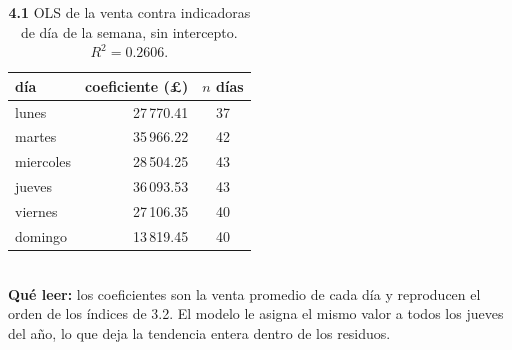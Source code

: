 \begin{table}[htbp]
\centering
\footnotesize
\caption{\textbf{4.1} OLS de la venta contra indicadoras de d\'ia de la semana, sin intercepto. $R^2 = 0.2606$.}
\label{tab:p4_ols_dow}
\begin{tabular}{lrc}
\toprule
\textbf{d\'ia} & \textbf{coeficiente (\pounds)} & \textbf{$n$ d\'ias} \\
\midrule
lunes & 27\,770.41 & 37 \\
martes & 35\,966.22 & 42 \\
miercoles & 28\,504.25 & 43 \\
jueves & 36\,093.53 & 43 \\
viernes & 27\,106.35 & 40 \\
domingo & 13\,819.45 & 40 \\
\bottomrule
\end{tabular}
\\[0.3em]{\scriptsize \textbf{Qu\'e leer:} los coeficientes son la venta promedio de cada d\'ia y reproducen el orden de los \'indices de 3.2. El modelo le asigna el mismo valor a todos los jueves del a\~no, lo que deja la tendencia entera dentro de los residuos.}
\end{table}
